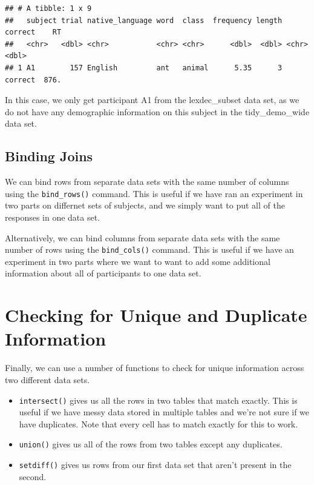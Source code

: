 \documentclass[
]{book}
\providecommand{\tightlist}{%
  \setlength{\itemsep}{0pt}\setlength{\parskip}{0pt}}
\begin{document}
\begin{verbatim}
## # A tibble: 1 x 9
##   subject trial native_language word  class  frequency length correct    RT
##   <chr>   <dbl> <chr>           <chr> <chr>      <dbl>  <dbl> <chr>   <dbl>
## 1 A1        157 English         ant   animal      5.35      3 correct  876.
\end{verbatim}

In this case, we only get participant A1 from the lexdec\_subset data set, as we do not have any demographic information on this subject in the tidy\_demo\_wide data set.

\hypertarget{binding-joins}{%
\subsection{Binding Joins}\label{binding-joins}}

We can bind rows from separate data sets with the same number of columns using the \texttt{bind\_rows()} command. This is useful if we have ran an experiment in two parts on differnet sets of subjects, and we simply want to put all of the responses in one data set.

Alternatively, we can bind columns from separate data sets with the same number of rows using the \texttt{bind\_cols()} command. This is useful if we have an experiment in two parts where we want to want to add some additional information about all of participants to one data set.

\hypertarget{checking-for-unique-and-duplicate-information}{%
\section{Checking for Unique and Duplicate Information}\label{checking-for-unique-and-duplicate-information}}

Finally, we can use a number of functions to check for unique information across two different data sets.

\begin{itemize}
\tightlist
\item
  \texttt{intersect()} gives us all the rows in two tables that match exactly. This is useful if we have messy data stored in multiple tables and we're not sure if we have duplicates. Note that every cell has to match exactly for this to work.
\item
  \texttt{union()} gives us all of the rows from two tables except any duplicates.
\item
  \texttt{setdiff()} gives us rows from our first data set that aren't present in the second.
\end{itemize}
\end{document}
